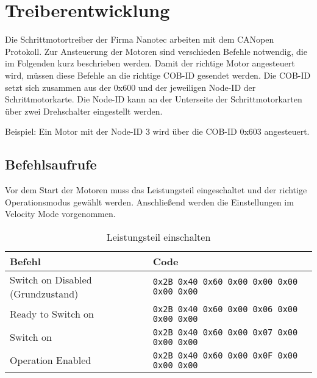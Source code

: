 

\section{Treiberentwicklung}
\label{sec:Treiber}

Die Schrittmotortreiber der Firma Nanotec arbeiten mit dem CANopen Protokoll. Zur Ansteuerung der Motoren sind verschieden Befehle notwendig, die im Folgenden kurz beschrieben werden. Damit der richtige Motor angesteuert wird, müssen diese Befehle an die richtige COB-ID gesendet werden. Die COB-ID setzt sich zusammen aus der 0x600 und der jeweiligen Node-ID der Schrittmotorkarte. Die Node-ID kann an der Unterseite der Schrittmotorkarten über zwei Drehschalter eingestellt werden. 

Beispiel: 
Ein Motor mit der Node-ID 3 wird über die COB-ID 0x603 angesteuert.


\subsection{Befehlsaufrufe}

Vor dem Start der Motoren muss das Leistungsteil eingeschaltet und der richtige Operationsmodus gewählt werden. Anschließend werden die Einstellungen im Velocity Mode vorgenommen. 

\begin{table}[H]
    \begin{tabularx}{\textwidth}{@{}Xl@{}} \toprule
    
 
    Befehl & Code \\
    \midrule
    
    Switch on Disabled (Grundzustand)  &
    \lstinline{0x2B 0x40 0x60 0x00 0x00 0x00 0x00 0x00} \\

    Ready to Switch on  &
    \lstinline{0x2B 0x40 0x60 0x00 0x06 0x00 0x00 0x00} \\

   Switch on  &
    \lstinline{0x2B 0x40 0x60 0x00 0x07 0x00 0x00 0x00} \\
    
    Operation Enabled  &
    \lstinline{0x2B 0x40 0x60 0x00 0x0F 0x00 0x00 0x00} \\

    \bottomrule
    \end{tabularx}
    \caption{Leistungsteil einschalten}
\end{table}



